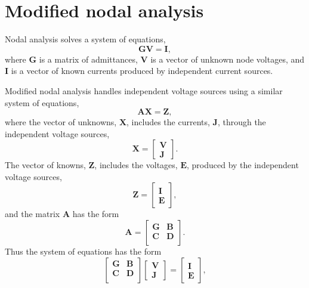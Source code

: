 \documentclass[a4paper, 12pt]{article}
\newcommand{\mat}[1]{\mathbf{#1}}
\renewcommand{\vec}[1]{\mathbf{#1}}
\begin{document}
\section{Modified nodal analysis}

Nodal analysis solves a system of equations,
%
\begin{equation}
  \mat{G} \vec{V} = \vec{I},
\end{equation}
%
where $\mat{G}$ is a matrix of admittances, $\vec{V}$ is a vector of
unknown node voltages, and $\vec{I}$ is a vector of known currents
produced by independent current sources.

Modified nodal analysis handles independent voltage sources using a
similar system of equations,
%
\begin{equation}
  \mat{A} \vec{X} = \vec{Z},
\end{equation}
%
where the vector of unknowns, $\vec{X}$, includes the currents,
$\vec{J}$, through the independent voltage sources,
%
\begin{equation}
  \mat{X} =
  \begin{bmatrix}
    \vec{V} \\ \vec{J}
  \end{bmatrix}.
\end{equation}
%
The vector of knowns, $\vec{Z}$, includes the voltages, $\vec{E}$,
produced by the independent voltage sources,
%
\begin{equation}
    \mat{Z} =
  \begin{bmatrix}
    \vec{I} \\ \vec{E}
  \end{bmatrix},
\end{equation}
%
and the matrix $\mat{A}$ has the form
%
\begin{equation}
  \mat{A} =
  \begin{bmatrix}
    \mat{G} & \mat{B} \\
    \mat{C} & \mat{D} \\
  \end{bmatrix}.
\end{equation}
%
Thus the system of equations has the form
%
\begin{equation}
  \begin{bmatrix}
    \mat{G} & \mat{B} \\
    \mat{C} & \mat{D} \\
  \end{bmatrix}
  \begin{bmatrix}
    \vec{V} \\ \vec{J}
  \end{bmatrix}
=
  \begin{bmatrix}
    \vec{I} \\ \vec{E}
  \end{bmatrix},
\end{equation}
\end{document}
